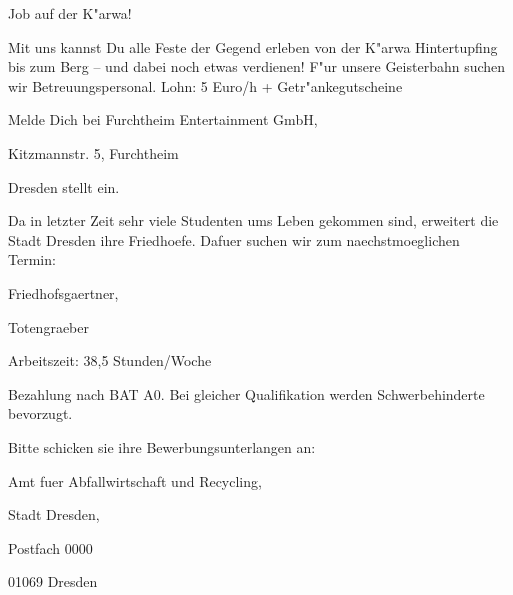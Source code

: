 \documentclass[a4paper, 12pt]{article}
\begin{document}
  { \concrete \baselineskip 18pt
  { \center \concslbig

  Job auf der K"arwa! 

  } \medskip

  Mit uns kannst Du alle Feste der Gegend erleben von der
  K"arwa Hintertupfing bis zum Berg -- und dabei noch etwas verdienen!
  F"ur unsere Geisterbahn suchen wir Betreuungspersonal.
  Lohn: 5 Euro/h + Getr"ankegutscheine

  \smallskip
     
  \hfill     Melde Dich bei Furchtheim Entertainment GmbH,

  \hfill                   Kitzmannstr. 5, Furchtheim

  }

\vskip 5cm

  { \helv
  { \helvboldbig \center

  Dresden stellt ein.

  }
  \medskip

  Da in letzter Zeit sehr viele Studenten ums Leben gekommen sind,
  erweitert die Stadt Dresden ihre Friedhoefe.
  Dafuer suchen wir zum naechstmoeglichen Termin:

  \medskip

  { \helvbold

  \hskip 2cm   Friedhofsgaertner,

  \smallskip

  \hskip 2cm   Totengraeber
 
  }
 
  \medskip

  Arbeitszeit: 38,5 Stunden/Woche

  Bezahlung nach BAT A0. Bei gleicher Qualifikation werden
  Schwerbehinderte bevorzugt.

  Bitte schicken sie ihre Bewerbungsunterlangen an:

  \medskip

  \hskip 2cm    Amt fuer Abfallwirtschaft und Recycling,

  \hskip 2cm      Stadt Dresden,

  \hskip 2cm    Postfach 0000

  \hskip 2cm    01069 Dresden

  }
\end{document}
